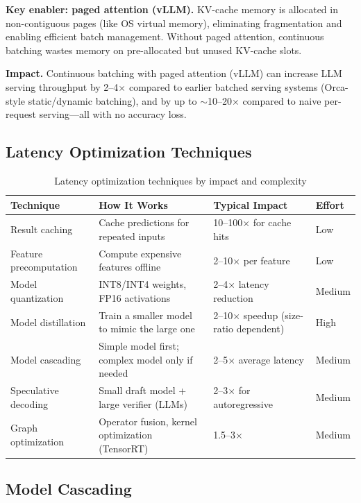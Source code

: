 \textbf{Key enabler: paged attention (vLLM).} KV-cache memory is allocated in non-contiguous pages (like OS virtual memory), eliminating fragmentation and enabling efficient batch management. Without paged attention, continuous batching wastes memory on pre-allocated but unused KV-cache slots.

\textbf{Impact.} Continuous batching with paged attention (vLLM) can increase LLM serving throughput by 2--4$\times$ compared to earlier batched serving systems (Orca-style static/dynamic batching), and by up to $\sim$10--20$\times$ compared to naive per-request serving---all with no accuracy loss.

\subsection{Latency Optimization Techniques}

\begin{table}[H]
\centering
\caption{Latency optimization techniques by impact and complexity}
\begin{tabularx}{\textwidth}{lXXl}
\toprule
\textbf{Technique} & \textbf{How It Works} & \textbf{Typical Impact} & \textbf{Effort} \\
\midrule
Result caching & Cache predictions for repeated inputs & 10--100$\times$ for cache hits & Low \\
Feature precomputation & Compute expensive features offline & 2--10$\times$ per feature & Low \\
Model quantization & INT8/INT4 weights, FP16 activations & 2--4$\times$ latency reduction & Medium \\
Model distillation & Train a smaller model to mimic the large one & 2--10$\times$ speedup (size-ratio dependent) & High \\
Model cascading & Simple model first; complex model only if needed & 2--5$\times$ average latency & Medium \\
Speculative decoding & Small draft model + large verifier (LLMs) & 2--3$\times$ for autoregressive & Medium \\
Graph optimization & Operator fusion, kernel optimization (TensorRT) & 1.5--3$\times$ & Medium \\
\bottomrule
\end{tabularx}
\end{table}

\subsection{Model Cascading}

